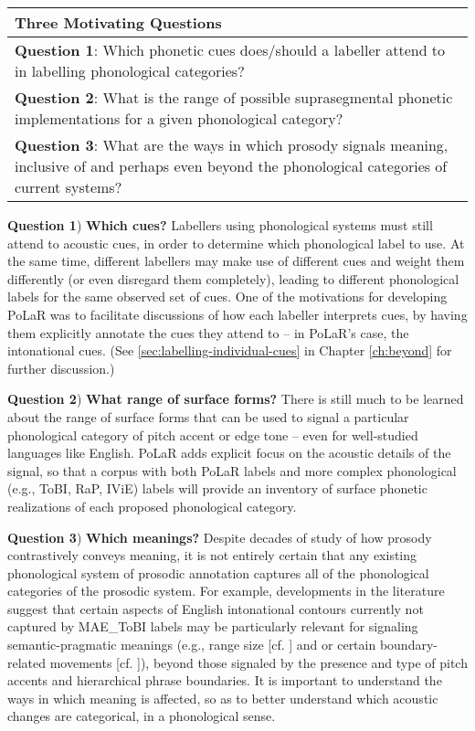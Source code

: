 \begin{center}
\renewcommand{\arraystretch}{1.5}
\begin{tabular}{>{\raggedright\arraybackslash}p{.85\linewidth}}
\textbf{Three Motivating Questions}\\
\hline
\textbf{Question 1}: Which phonetic cues does\slash should a labeller attend to in labelling phonological categories?\\
\textbf{Question 2}: What is the range of possible suprasegmental phonetic implementations for a given phonological category?\\
\textbf{Question 3}: What are the ways in which prosody signals meaning, inclusive of and perhaps even beyond the phonological categories of current systems?\\
\end{tabular}
\end{center}


\textbf{Question 1}) \textbf{Which cues?} Labellers using phonological systems must still attend to acoustic cues, in order to determine which phonological label to use. At the same time, different labellers may make use of different cues and weight them differently (or even disregard them completely), leading to different phonological labels for the same observed set of cues. One of the motivations for developing PoLaR was to facilitate discussions of how each labeller interprets cues, by having them explicitly annotate the cues they attend to -- in PoLaR’s case, the intonational cues.  (See \ref{sec:labelling-individual-cues} in Chapter \ref{ch:beyond} for further discussion.)

\textbf{Question 2}) \textbf{What range of surface forms?} There is still much to be learned about the range of surface forms that can be used to signal a particular phonological category of pitch accent or edge tone – even for well-studied languages like English. PoLaR adds explicit focus on the acoustic details of the signal, so that a corpus with both PoLaR labels and more complex phonological (e.g., ToBI, RaP, IViE) labels will provide an inventory of surface phonetic realizations of each proposed phonological category.

\textbf{Question 3}) \textbf{Which meanings?} Despite decades of study of how prosody contrastively conveys meaning, it is not entirely certain that any existing phonological system of prosodic annotation captures all of the phonological categories of the prosodic system. For example, developments in the literature suggest that certain aspects of English intonational contours currently not captured by MAE\_ToBI labels may be particularly relevant for signaling semantic-pragmatic meanings (e.g., range size [cf. \citealt{ladd94}] and or certain boundary-related movements [cf. \citealt{ahn-16}]), beyond those signaled by the presence and type of pitch accents and hierarchical phrase boundaries. It is important to understand the ways in which meaning is affected, so as to better understand which acoustic changes are categorical, in a phonological sense.

